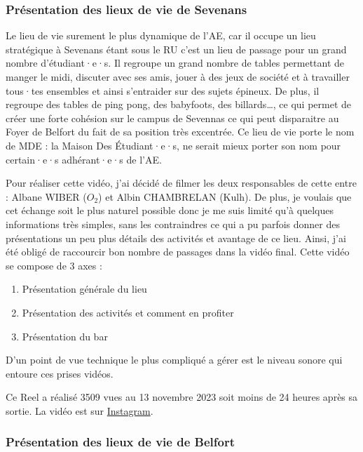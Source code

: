 \subsubsection{Présentation des lieux de vie de Sevenans}

Le lieu de vie surement le plus dynamique de l'\gls{AE}, car il occupe un lieu stratégique à Sevenans étant sous le RU c'est un lieu de passage pour un grand nombre d'étudiant·e·s.
Il regroupe un grand nombre de tables permettant de manger le midi, discuter avec ses amis, jouer à des jeux de société et à travailler tous·tes ensembles et ainsi s'entraider sur des sujets épineux.
De plus, il regroupe des tables de ping pong, des babyfoots, des billards\ldots, ce qui permet de créer une forte cohésion sur le campus de Sevennas ce qui peut disparaitre au Foyer de Belfort du fait de sa position très excentrée.
Ce lieu de vie porte le nom de MDE : la Maison Des Étudiant·e·s, ne serait mieux porter son nom pour certain·e·s adhérant·e·s de l'\gls{AE}.

Pour réaliser cette vidéo, j'ai décidé de filmer les deux responsables de cette entre : Albane WIBER ($O_2$) et Albin CHAMBRELAN (Kulh).
De plus, je voulais que cet échange soit le plus naturel possible donc je me suis limité qu'à quelques informations très simples, sans les contraindres ce qui a pu parfois donner des présentations un peu plus détails des activités et avantage de ce lieu.
Ainsi, j'ai été obligé de raccourcir bon nombre de passages dans la vidéo final.
Cette vidéo se compose de 3 axes :
\begin{enumerate}
    \item Présentation générale du lieu
    \item Présentation des activités et comment en profiter
    \item Présentation du bar
\end{enumerate}

D'un point de vue technique le plus compliqué a gérer est le niveau sonore qui entoure ces prises vidéos.

Ce Reel a réalisé 3509 vues au 13 novembre 2023 soit moins de 24 heures après sa sortie.
La vidéo est sur \href{https://www.instagram.com/reel/CzjfX8Xs5X1/?utm_source=ig_web_copy_link&igshid=MzRlODBiNWFlZA==}{Instagram}.


\subsubsection{Présentation des lieux de vie de Belfort}

